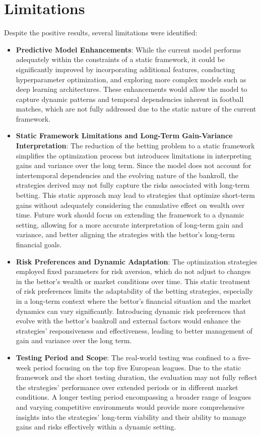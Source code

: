 \section{Limitations}

Despite the positive results, several limitations were identified:

\begin{itemize}
    \item \textbf{Predictive Model Enhancements}: While the current model performs adequately within the constraints of a static framework, it could be significantly improved by incorporating additional features, conducting hyperparameter optimization, and exploring more complex models such as deep learning architectures. These enhancements would allow the model to capture dynamic patterns and temporal dependencies inherent in football matches, which are not fully addressed due to the static nature of the current framework.

    \item \textbf{Static Framework Limitations and Long-Term Gain-Variance Interpretation}: The reduction of the betting problem to a static framework simplifies the optimization process but introduces limitations in interpreting gains and variance over the long term. Since the model does not account for intertemporal dependencies and the evolving nature of the bankroll, the strategies derived may not fully capture the risks associated with long-term betting. This static approach may lead to strategies that optimize short-term gains without adequately considering the cumulative effect on wealth over time. Future work should focus on extending the framework to a dynamic setting, allowing for a more accurate interpretation of long-term gain and variance, and better aligning the strategies with the bettor's long-term financial goals.

    \item \textbf{Risk Preferences and Dynamic Adaptation}: The optimization strategies employed fixed parameters for risk aversion, which do not adjust to changes in the bettor's wealth or market conditions over time. This static treatment of risk preferences limits the adaptability of the betting strategies, especially in a long-term context where the bettor's financial situation and the market dynamics can vary significantly. Introducing dynamic risk preferences that evolve with the bettor's bankroll and external factors would enhance the strategies' responsiveness and effectiveness, leading to better management of gain and variance over the long term.

    \item \textbf{Testing Period and Scope}: The real-world testing was confined to a five-week period focusing on the top five European leagues. Due to the static framework and the short testing duration, the evaluation may not fully reflect the strategies' performance over extended periods or in different market conditions. A longer testing period encompassing a broader range of leagues and varying competitive environments would provide more comprehensive insights into the strategies' long-term viability and their ability to manage gains and risks effectively within a dynamic setting.

\end{itemize}
